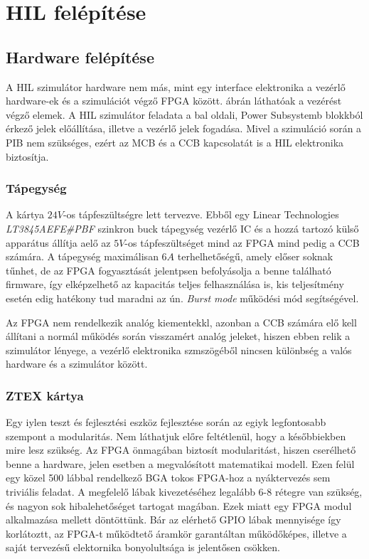 \chapter{HIL felépítése}

\todo

\section{Hardware felépítése}

A HIL szimulátor hardware nem más, mint egy interface elektronika a vezérlő hardware-ek és a szimulációt végző FPGA között.  ábrán láthatóak a vezérést végző elemek. A HIL szimulátor feladata a bal oldali, Power Subsystemb blokkból érkező jelek előállítása, illetve a vezérlő jelek fogadása. Mivel a szimuláció során a PIB nem szükséges, ezért az MCB és a CCB kapcsolatát is a HIL elektronika biztosítja.


\subsection{Tápegység}
A kártya $24 V$-os tápfeszültségre lett tervezve. Ebből egy Linear Technologies \emph{LT3845AEFE#PBF} szinkron buck tápegység vezérlő IC és a hozzá tartozó külső apparátus állítja aelő az $5 V$-os tápfeszültséget mind az FPGA mind pedig a CCB számára. A tápegység maximálisan $6 A$ terhelhetőségű, amely előser soknak tűnhet, de az FPGA fogyasztását jelentpsen befolyásolja a benne található firmware, így elképzelhető az kapacitás teljes felhasználása is, kis teljesítmény esetén edig hatékony tud maradni az ún. \emph{Burst mode} működési mód segítségével.


Az FPGA nem rendelkezik analóg kiementekkl, azonban a CCB számára elő kell állítani a normál működés során visszamért analóg jeleket, hiszen ebben relik a szimulátor lényege, a vezérlő elektronika szmszögéből nincsen különbség a valós hardware és a szimulátor között. 

\subsection{ZTEX kártya}

Egy iylen teszt és fejlesztési eszköz fejlesztése során az egiyk legfontosabb szempont a modularitás. Nem láthatjuk előre feltétlenül, hogy a későbbiekben mire lesz szükség. Az FPGA önmagában biztosít modularitást, hiszen cserélhető benne a hardware, jelen esetben a megvalósított matematikai modell. Ezen felül egy közel 500 lábbal rendelkező BGA tokos FPGA-hoz a nyáktervezés sem triviális feladat. A megfelelő lábak kivezetéséhez legalább 6-8 rétegre van szükség, és nagyon sok hibalehetőséget tartogat magában. Ezek miatt egy FPGA modul alkalmazása mellett döntöttünk. Bár az elérhető GPIO lábak mennyisége így korlátoztt, az FPGA-t működtető áramkör garantáltan működőképes, illetve a saját tervezésű elektornika bonyolultsága is jelentősen csökken.

